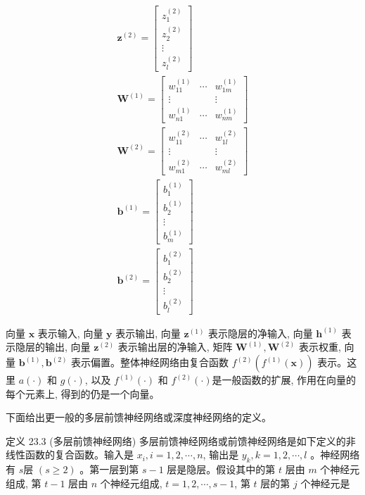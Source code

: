 \documentclass[10pt]{article}
\begin{document}
\begin{CJK*}{UTF8}{bsmi}
$$
\begin{gathered}
\boldsymbol{z}^{(2)}=\left[\begin{array}{c}
z_{1}^{(2)} \\
z_{2}^{(2)} \\
\vdots \\
z_{l}^{(2)}
\end{array}\right] \\
\boldsymbol{W}^{(1)}=\left[\begin{array}{ccc}
w_{11}^{(1)} & \cdots & w_{1 m}^{(1)} \\
\vdots & & \vdots \\
w_{n 1}^{(1)} & \cdots & w_{n m}^{(1)}
\end{array}\right] \\
\boldsymbol{W}^{(2)}=\left[\begin{array}{ccc}
w_{11}^{(2)} & \cdots & w_{1 l}^{(2)} \\
\vdots & & \vdots \\
w_{m 1}^{(2)} & \cdots & w_{m l}^{(2)}
\end{array}\right] \\
\boldsymbol{b}^{(1)}=\left[\begin{array}{cc}
b_{1}^{(1)} \\
b_{2}^{(1)} \\
\vdots \\
b_{m}^{(1)}
\end{array}\right] \\
\boldsymbol{b}^{(2)}=\left[\begin{array}{c}
b_{1}^{(2)} \\
b_{2}^{(2)} \\
\vdots \\
b_{l}^{(2)}
\end{array}\right]
\end{gathered}
$$

向量 $\boldsymbol{x}$ 表示输入, 向量 $\boldsymbol{y}$ 表示输出, 向量 $\boldsymbol{z}^{(1)}$ 表示隐层的净输入, 向量 $\boldsymbol{h}^{(1)}$ 表示隐层的输出, 向量 $\boldsymbol{z}^{(2)}$ 表示输出层的净输入, 矩阵 $\boldsymbol{W}^{(1)}, \boldsymbol{W}^{(2)}$ 表示权重, 向量 $\boldsymbol{b}^{(1)}, \boldsymbol{b}^{(2)}$ 表示偏置。整体神经网络由复合函数 $f^{(2)}\left(f^{(1)}(\boldsymbol{x})\right)$ 表示。这里 $a(\cdot)$ 和 $g(\cdot)$, 以及 $f^{(1)}(\cdot)$ 和 $f^{(2)}(\cdot)$是一般函数的扩展, 作用在向量的每个元素上, 得到的仍是一个向量。

下面给出更一般的多层前馈神经网络或深度神经网络的定义。

定义 23.3 (多层前馈神经网络) 多层前馈神经网络或前馈神经网络是如下定义的非线性函数的复合函数。输入是 $x_{i}, i=1,2, \cdots, n$, 输出是 $y_{k}, k=1,2, \cdots, l$ 。神经网络有 $s$层 $(s \geqslant 2)$ 。第一层到第 $s-1$ 层是隐层。假设其中的第 $t$ 层由 $m$ 个神经元组成, 第 $t-1$ 层由 $n$ 个神经元组成, $t=1,2, \cdots, s-1$, 第 $t$ 层的第 $j$ 个神经元是



\end{CJK*}
\end{document}
